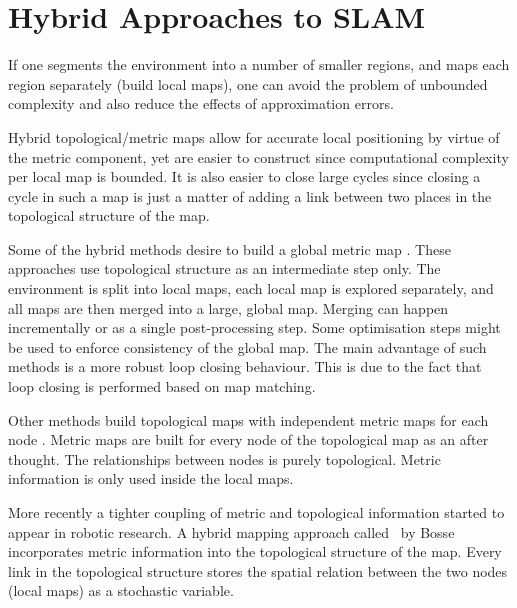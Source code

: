 \section{Hybrid Approaches to SLAM} 

If one segments the environment into a number of smaller regions, and
maps each region separately (build local maps), one can avoid the
problem of unbounded complexity and also reduce the effects of
approximation errors.

Hybrid topological/metric maps
\cite{fergusson2003,bosse03atlas,Thrun98a} allow for accurate local
positioning by virtue of the metric component, yet are easier to
construct since computational complexity per local map is bounded. It
is also easier to close large cycles since closing a cycle in such a
map is just a matter of adding a link between two places in the
topological structure of the map.


Some of the hybrid methods desire to build a global metric map
\cite{Thrun98a, slam_thrun98b}. These approaches use topological
structure as an intermediate step only. The environment is split into
local maps, each local map is explored separately, and all maps are
then merged into a large, global map. Merging can happen incrementally
or as a single post-processing step. Some optimisation steps might be
used to enforce consistency of the global map. The main advantage of
such methods is a more robust loop closing behaviour. This is due to
the fact that loop closing is performed based on map matching.

Other methods build topological maps with independent metric maps for
each node \cite{Cho01,Kuipers00}. Metric maps are built for every node of the
topological map as an after thought. The relationships between nodes
is purely topological. Metric information is only used inside the
local maps.

More recently a tighter coupling of metric and topological
information started to appear in robotic research. A hybrid mapping
approach called \Atlas\ by Bosse \etal\ \cite{bosse03atlas} incorporates
metric information into the topological structure of the map. Every
link in the topological structure stores the spatial relation between
the two nodes (local maps) as a stochastic variable. 



